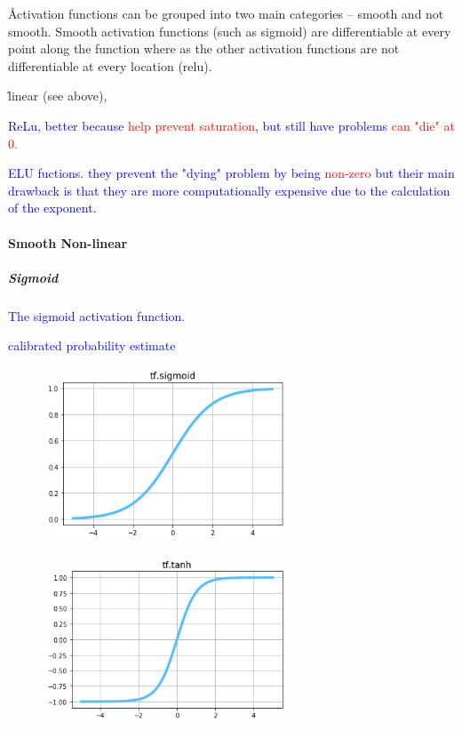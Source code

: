 \r{Activation functions can be grouped into two main categories -- smooth and not smooth. Smooth activation functions (such as sigmoid) are differentiable at every point along the function where as the other activation functions are not differentiable at every location (relu).}



\r{linear (see above), }

\textcolor{blue}{ReLu, better because \textcolor{red}{help prevent saturation}, but still have problems \textcolor{red}{can "die" at 0.} }

\textcolor{blue}{ELU fuctions. they prevent the "dying" problem by being \textcolor{red}{non-zero} but their main drawback is that they are more computationally expensive due to the calculation of the exponent.}

\paragraph{Smooth Non-linear}

\subparagraph{Sigmoid}

\textcolor{blue}{The sigmoid activation function.}

\textcolor{blue}{calibrated probability estimate}


\begin{figure}
	\centering
	\includegraphics[width=0.65\textwidth]{./sync_imgs/act/smooth/sigmoid.png}
	\label{fig:act_smooth_sigmoid}
\end{figure}

\begin{figure}
	\centering
	\includegraphics[width=0.65\textwidth]{./sync_imgs/act/smooth/tangent.png}
	\label{fig:act_smooth_tangent}
\end{figure}

